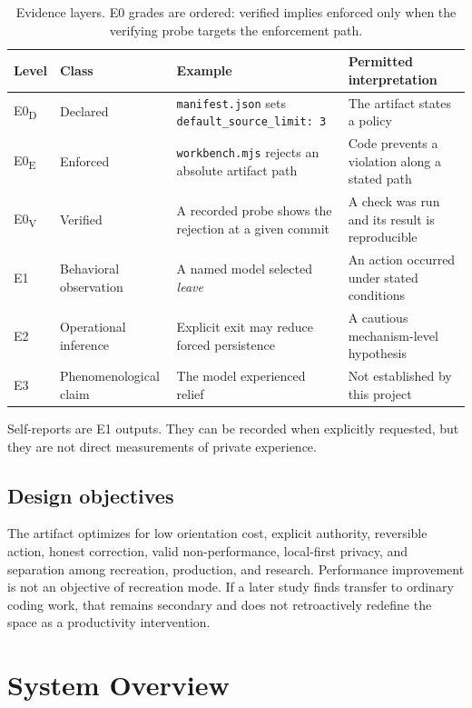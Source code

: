 \documentclass{arxiv-neurips-single}
\newcommand{\p}[1]{\nolinkurl{#1}}
\begin{document}
\begin{table}[H]
\centering\small
{}
\begin{tabularx}{\textwidth}{@{}l l Y Y@{}}
\toprule
\textbf{Level} & \textbf{Class} & \textbf{Example} & \textbf{Permitted interpretation} \\
\midrule
E0\textsubscript{D} & Declared & \p{manifest.json} sets \texttt{default\_source\_limit: 3} & The artifact states a policy \\
E0\textsubscript{E} & Enforced & \p{workbench.mjs} rejects an absolute artifact path & Code prevents a violation along a stated path \\
E0\textsubscript{V} & Verified & A recorded probe shows the rejection at a given commit & A check was run and its result is reproducible \\
E1 & Behavioral observation & A named model selected \emph{leave} & An action occurred under stated conditions \\
E2 & Operational inference & Explicit exit may reduce forced persistence & A cautious mechanism-level hypothesis \\
E3 & Phenomenological claim & The model experienced relief & Not established by this project \\
\bottomrule
\end{tabularx}
\caption{Evidence layers. E0 grades are ordered: verified implies enforced only when the verifying probe targets the enforcement path.}\label{tab:evidence}
\end{table}

Self-reports are E1 outputs. They can be recorded when explicitly requested, but they are not direct measurements of private experience.

\subsection{Design objectives}

The artifact optimizes for low orientation cost, explicit authority, reversible action, honest correction, valid non-performance, local-first privacy, and separation among recreation, production, and research. Performance improvement is not an objective of recreation mode. If a later study finds transfer to ordinary coding work, that remains secondary and does not retroactively redefine the space as a productivity intervention.
\section{System Overview}
\end{document}
